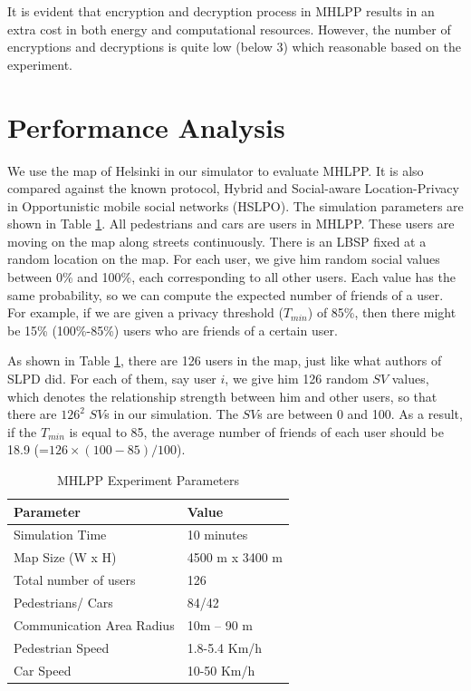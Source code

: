 It is evident that encryption and decryption process in MHLPP results in an extra cost in both energy and computational resources. However, the number of encryptions and decryptions is quite low (below 3) which reasonable based on the experiment.

\section{ Performance Analysis}

\noindent We use the map of Helsinki in our simulator to evaluate MHLPP. It is also compared against the known protocol, Hybrid and Social-aware Location-Privacy in Opportunistic mobile social networks (HSLPO). The simulation parameters are shown in Table \ref{table:MhlppExperimentParameters}. All pedestrians and cars are users in MHLPP. These users are moving on the map along streets continuously. There is an LBSP fixed at a random location on the map. For each user, we give him random social values between 0\% and 100\%, each corresponding to all other users. Each value has the same probability, so we can compute the expected number of friends of a user. For example, if we are given a privacy threshold (${T}_{min}$) of 85\%, then there might be 15\% (100\%-85\%) users who are friends of a certain user.

As shown in Table \ref{table:MhlppExperimentParameters}, there are 126 users in the map, just like what authors of SLPD did. For each of them, say user $i$, we give him 126 random $SV$ values, which denotes the relationship strength between him and other users, so that there are ${126}^2$ $SV$s in our simulation. The $SV$s are between 0 and 100. As a result, if the ${T}_{min}$ is equal to 85, the average number of friends of each user should be 18.9 (=$126\times (100-85)/100$).

\begin{table} [hbtp]
\caption{MHLPP Experiment Parameters}
\label{table:MhlppExperimentParameters}
\centering
\begin{tabular}{|l|l|} \hline 
Parameter & Value \\ \hline 
Simulation Time & 10 minutes \\ \hline 
Map Size (W x H) & 4500 m x 3400 m \\ \hline 
Total number of users & 126 \\ \hline 
Pedestrians/ Cars & 84/42 \\ \hline 
Communication Area Radius & 10m -- 90 m \\ \hline 
Pedestrian Speed & 1.8-5.4 Km/h \\ \hline 
Car Speed & 10-50 Km/h \\ \hline 
\end{tabular}
\end{table}

